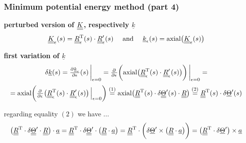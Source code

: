 \begin{frame}
  \frametitle{Minimum potential energy method (part 4)}
  
  \textbf{perturbed version of $\underline{\underline{K}}$, respectively $\underline{k}$}
  \begin{displaymath}
    \underline{\underline{K}}_{\epsilon}(s) =
    \underline{\underline{R}}_{\epsilon}^{\mathrm{T}}(s) \cdot \underline{\underline{R}}_{\epsilon}^{\prime}(s)
    \quad \text{ and } \quad
    \underline{k}_{\epsilon}(s) = \mathrm{axial} \bigl( \underline{\underline{K}}_{\epsilon}(s) \bigr)
  \end{displaymath}
  
  \vspace{0.5em}
  \textbf{first variation of $\underline{k}$}
  \begin{displaymath}
    \delta \underline{k}(s) =
    \pd{\underline{k}_{\epsilon}}{\epsilon}(s) \sVert[3]_{\epsilon=0} =
    \pd{}{\epsilon} \biggl( \axial \bigl( \doubleunderline{R}_{\epsilon}^{\mathrm{T}}(s) \cdot \doubleunderline{R}_{\epsilon}^{\prime}(s) \bigr) \biggr) \sVert[3]_{\epsilon=0} =
  \end{displaymath}
  \begin{displaymath}
    = \axial \biggl( \pd{}{\epsilon} \bigl( \doubleunderline{R}_{\epsilon}^{\mathrm{T}}(s) \cdot \doubleunderline{R}_{\epsilon}^{\prime}(s) \bigr) \sVert[2]_{\epsilon=0} \biggr) \overset{(1)}{=}
    \axial \bigl( \doubleunderline{R}^{\mathrm{T}}(s) \cdot \delta \doubleunderline{\Theta}^{\prime}(s) \cdot \doubleunderline{R} \bigr) \overset{(2)}{=}
    \doubleunderline{R}^{\mathrm{T}}(s) \cdot \delta \underline{\Theta}^{\prime}(s)      
  \end{displaymath}
  
  \vspace{0.5em}
  regarding equality $(2)$ we have ...
  \begin{displaymath}
    \bigl( \underline{\underline{R}}^{\mathrm{T}} \cdot \delta \underline{\underline{\Theta}}^{\prime} \cdot \underline{\underline{R}} \bigr) \cdot \underline{a} =
    \underline{\underline{R}}^{\mathrm{T}} \cdot \delta \underline{\underline{\Theta}}^{\prime} \cdot \bigl( \underline{\underline{R}} \cdot \underline{a} \bigr) =
    \underline{\underline{R}}^{\mathrm{T}} \cdot \biggl( \delta \underline{\Theta}^{\prime} \times \bigl( \underline{\underline{R}} \cdot \underline{a} \bigr) \biggr) =
    \bigl( \underline{\underline{R}}^{\mathrm{T}} \cdot \delta \underline{\Theta}^{\prime} \bigr) \times \underline{a}
  \end{displaymath}
\end{frame}


